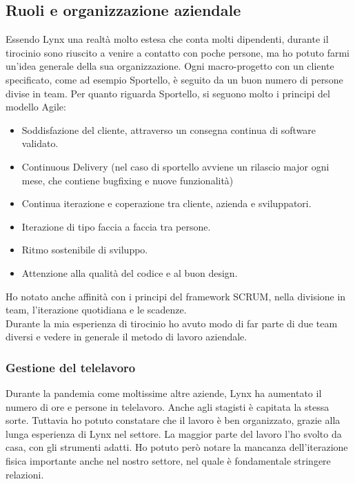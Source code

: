 \subsection{Ruoli e organizzazione aziendale}
Essendo Lynx una realtà molto estesa che conta molti dipendenti, durante il tirocinio sono riuscito a venire a contatto con poche persone, ma ho potuto farmi un'idea generale della sua organizzazione. Ogni macro-progetto con un cliente specificato, come ad esempio Sportello, è seguito da un buon numero di persone divise in team. Per quanto riguarda Sportello, si seguono molto i principi del modello Agile:
\begin{itemize}
	\item Soddisfazione del cliente, attraverso un consegna continua di software validato.
	\item Continuous Delivery (nel caso di sportello avviene un rilascio major ogni mese, che contiene bugfixing e nuove funzionalità)
	\item Continua iterazione e coperazione tra cliente, azienda e sviluppatori.
	\item Iterazione di tipo faccia a faccia tra persone.
	\item Ritmo sostenibile di sviluppo.
	\item Attenzione alla qualità del codice e al buon design.
\end{itemize}
Ho notato anche affinità con i principi del framework SCRUM, nella divisione in team, l'iterazione quotidiana e le scadenze.\\
Durante la mia esperienza di tirocinio ho avuto modo di far parte di due team diversi e vedere in generale il metodo di lavoro aziendale. 

\subsubsection{Gestione del telelavoro}
Durante la pandemia come moltissime altre aziende, Lynx ha aumentato il numero di ore e persone in telelavoro. Anche agli stagisti è capitata la stessa sorte. Tuttavia ho potuto constatare che il lavoro è ben organizzato, grazie alla lunga esperienza di Lynx nel settore.
La maggior parte del lavoro l'ho svolto da casa, con gli strumenti adatti. Ho potuto però notare la mancanza dell'iterazione fisica importante anche nel nostro settore, nel quale è fondamentale stringere relazioni.

\pagebreak